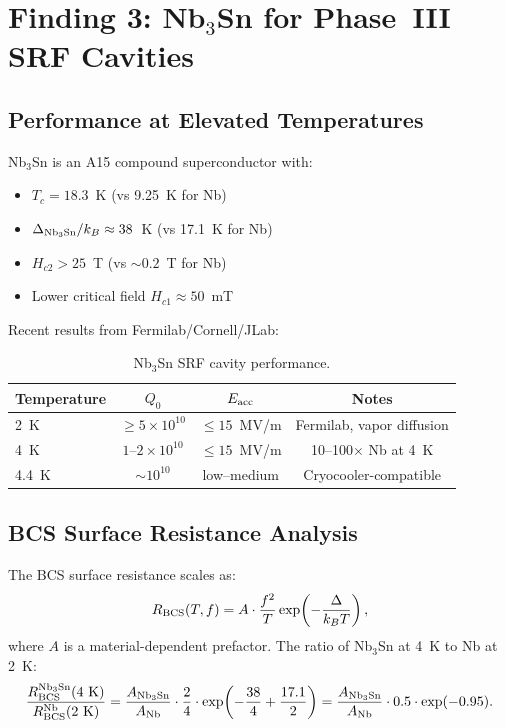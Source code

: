 \documentclass[11pt]{article}
\theoremstyle{definition}
\theoremstyle{remark}
\newcommand{\ee}[1]{\times 10^{#1}}
\begin{document}
\section{Finding 3: Nb$_3$Sn for Phase~III SRF Cavities}
\label{sec:nb3sn}

\subsection{Performance at Elevated Temperatures}

Nb$_3$Sn is an A15 compound superconductor with:
\begin{itemize}[nosep]
\item $T_c = 18.3$~K (vs 9.25~K for Nb)
\item $\Delta_{\rm Nb_3Sn}/k_B \approx 38$~K (vs 17.1~K for Nb)
\item $H_{c2} > 25$~T (vs $\sim 0.2$~T for Nb)
\item Lower critical field $H_{c1} \approx 50$~mT
\end{itemize}

Recent results from Fermilab/Cornell/JLab:
\begin{table}[H]
\centering
\caption{Nb$_3$Sn SRF cavity performance.}
\renewcommand{\arraystretch}{1.3}
\begin{tabular}{lccc}
\toprule
\textbf{Temperature} & $Q_0$ & $E_{\rm acc}$ & \textbf{Notes} \\
\midrule
2~K & $\geq 5\ee{10}$ & $\leq 15$~MV/m & Fermilab, vapor diffusion \\
4~K & $1$--$2\ee{10}$ & $\leq 15$~MV/m & 10--100$\times$ Nb at 4~K \\
4.4~K & $\sim 10^{10}$ & low--medium & Cryocooler-compatible \\
\bottomrule
\end{tabular}
\end{table}

\subsection{BCS Surface Resistance Analysis}

The BCS surface resistance scales as:
\begin{equation}
R_{\rm BCS}(T, f) = A \cdot \frac{f^2}{T}
  \exp\!\left(-\frac{\Delta}{k_B T}\right),
\label{eq:bcs_rs}
\end{equation}
where $A$ is a material-dependent prefactor. The ratio of Nb$_3$Sn
at 4~K to Nb at 2~K:
\begin{equation}
\frac{R_{\rm BCS}^{\rm Nb_3Sn}(4~{\rm K})}
     {R_{\rm BCS}^{\rm Nb}(2~{\rm K})}
= \frac{A_{\rm Nb_3Sn}}{A_{\rm Nb}} \cdot \frac{2}{4}
  \cdot \exp\!\left(-\frac{38}{4} + \frac{17.1}{2}\right)
= \frac{A_{\rm Nb_3Sn}}{A_{\rm Nb}} \cdot 0.5
  \cdot \exp(-0.95).
\label{eq:bcs_ratio}
\end{equation}
\end{document}
